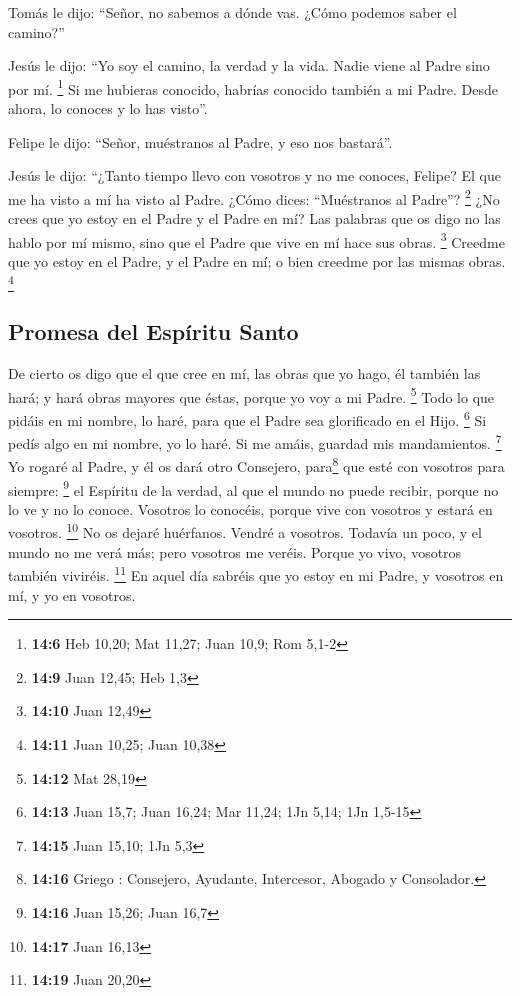\begin{paracol}{2}
 Tomás le dijo: ``Señor, no sabemos a dónde vas. ¿Cómo
podemos saber el camino?''

 Jesús le dijo: ``Yo soy el camino, la verdad y la vida.
Nadie viene al Padre sino por mí. \footnote{\textbf{14:6} Heb 10,20; Mat
  11,27; Juan 10,9; Rom 5,1-2}  Si me hubieras conocido,
habrías conocido también a mi Padre. Desde ahora, lo conoces y lo has
visto''.

 Felipe le dijo: ``Señor, muéstranos al Padre, y eso nos
bastará''.

 Jesús le dijo: ``¿Tanto tiempo llevo con vosotros y no me
conoces, Felipe? El que me ha visto a mí ha visto al Padre. ¿Cómo dices:
``Muéstranos al Padre''? \footnote{\textbf{14:9} Juan 12,45; Heb 1,3}
 ¿No crees que yo estoy en el Padre y el Padre en mí? Las
palabras que os digo no las hablo por mí mismo, sino que el Padre que
vive en mí hace sus obras. \footnote{\textbf{14:10} Juan 12,49}
 Creedme que yo estoy en el Padre, y el Padre en mí; o
bien creedme por las mismas obras. \footnote{\textbf{14:11} Juan 10,25;
  Juan 10,38}

\hypertarget{promesa-del-espuxedritu-santo}{%
\subsection{Promesa del Espíritu
Santo}\label{promesa-del-espuxedritu-santo}}

 De cierto os digo que el que cree en mí, las obras que
yo hago, él también las hará; y hará obras mayores que éstas, porque yo
voy a mi Padre. \footnote{\textbf{14:12} Mat 28,19}  Todo
lo que pidáis en mi nombre, lo haré, para que el Padre sea glorificado
en el Hijo. \footnote{\textbf{14:13} Juan 15,7; Juan 16,24; Mar 11,24;
  1Jn 5,14; 1Jn 1,5-15}  Si pedís algo en mi nombre, yo
lo haré.  Si me amáis, guardad mis mandamientos.
\footnote{\textbf{14:15} Juan 15,10; 1Jn 5,3}  Yo rogaré
al Padre, y él os dará otro Consejero, para\footnote{\textbf{14:16}
  Griego : Consejero, Ayudante, Intercesor, Abogado y
  Consolador.} que esté con vosotros para siempre: \footnote{\textbf{14:16}
  Juan 15,26; Juan 16,7}  el Espíritu de la verdad, al
que el mundo no puede recibir, porque no lo ve y no lo conoce. Vosotros
lo conocéis, porque vive con vosotros y estará en vosotros. \footnote{\textbf{14:17}
  Juan 16,13}  No os dejaré huérfanos. Vendré a vosotros.
 Todavía un poco, y el mundo no me verá más; pero
vosotros me veréis. Porque yo vivo, vosotros también viviréis.
\footnote{\textbf{14:19} Juan 20,20}  En aquel día
sabréis que yo estoy en mi Padre, y vosotros en mí, y yo en vosotros.


\end{paracol}
